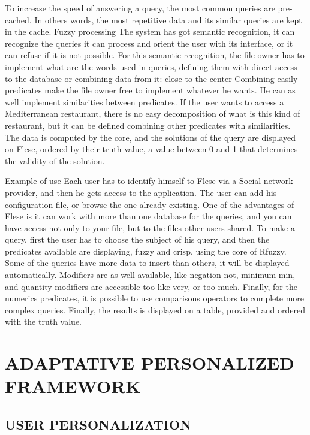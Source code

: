 \documentclass[a4paper,twoside]{article}
\begin{document}
To increase the speed of answering a query, the most common queries are pre-cached. In others words, the most repetitive data and its similar queries are kept in the cache.
Fuzzy processing
The system has got semantic recognition, it can recognize the queries it can process and orient the user with its interface, or it can refuse if it is not possible.
For this semantic recognition, the file owner has to implement what are the words used in queries, defining them with direct access to the database or combining data from it:
close to the center
Combining easily predicates make the file owner free to implement whatever he wants. He can as well implement similarities between predicates. If the user wants to access a Mediterranean restaurant, there is no easy decomposition of what is this kind of restaurant, but it can be defined combining other predicates with similarities. 
The data is computed by the core, and the solutions of the query are displayed on Flese, ordered by their truth value, a value between 0 and 1 that determines the validity of the solution.

Example of use
Each user has to identify himself to Flese via a Social network provider, and then he gets access to the application. The user can add his configuration file, or browse the one already existing.
One of the advantages of Flese is it can work with more than one database for the queries, and you can have access not only to your file, but to the files other users shared.
To make a query, first the user has to choose the subject of his query, and then the predicates available are displaying, fuzzy and crisp, using the core of Rfuzzy. Some of the queries have more data to insert than others, it will be displayed automatically.
Modifiers are as well available, like negation not, minimum min, and quantity modifiers are accessible too like very, or too much. Finally, for the numerics predicates, it is possible to use comparisons operators to complete more complex queries.
Finally, the results is displayed on a table, provided and ordered with the truth value.

\section{\uppercase{\uppercase{Adaptative personalized framework}}}

\subsection{\uppercase{user personalization}}
\end{document}
